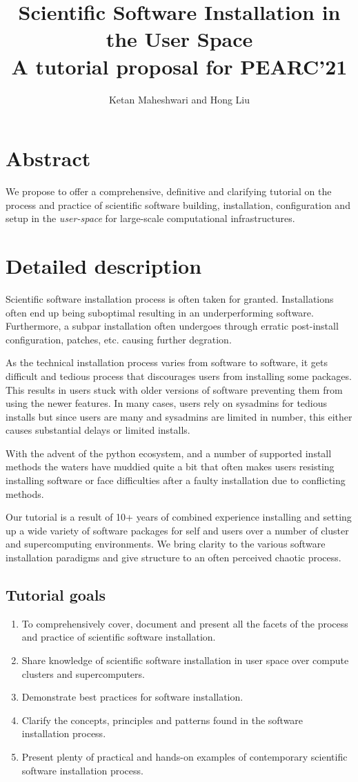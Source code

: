 \documentclass{report}
\title{Scientific Software Installation in the User Space\\
       \large A tutorial proposal for PEARC'21
			 }
\author{Ketan Maheshwari and Hong Liu}
\begin{document}
\maketitle
\section*{Abstract}
We propose to offer a comprehensive, definitive and clarifying tutorial on the
process and practice of scientific software building, installation,
configuration and setup in the \emph{user-space} for large-scale computational
infrastructures.

\section*{Detailed description}
Scientific software installation process is often taken for granted.
Installations often end up being suboptimal resulting in an underperforming
software. Furthermore, a subpar installation often undergoes through erratic
post-install configuration, patches, etc. causing further degration.

As the technical installation process varies from software to software, it gets
difficult and tedious process that discourages users from installing some
packages. This results in users stuck with older versions of software
preventing them from using the newer features. In many cases, users rely on
sysadmins for tedious installs but since users are many and sysadmins are
limited in number, this either causes substantial delays or limited installs. 

With the advent of the python ecosystem, and a number of supported install methods
the waters have muddied quite a bit that often makes users resisting installing
software or face difficulties after a faulty installation due to conflicting methods.

Our tutorial is a result of 10+ years of combined experience installing and
setting up a wide variety of software packages for self and users over a number
of cluster and supercomputing environments. We bring clarity to the various
software installation paradigms and give structure to an often perceived
chaotic process.

\subsection*{Tutorial goals}
\begin{enumerate}
\item To comprehensively cover, document and present all the facets of the process and practice of scientific software installation.
\item Share knowledge of scientific software installation in user space over compute clusters and supercomputers.
\item Demonstrate best practices for software installation.
\item Clarify the concepts, principles and patterns found in the software installation process.
\item Present plenty of practical and hands-on examples of contemporary scientific software installation process.
\end{enumerate}
\end{document}
